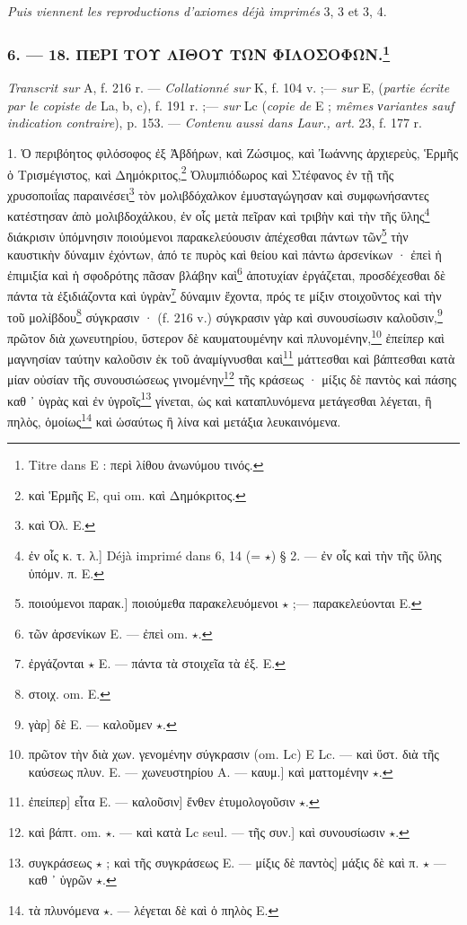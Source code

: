 \documentclass[a4paper, 11pt, oneside, polutonikogreek, french]{article}
\begin{document}
\emph{Puis viennent les reproductions d'axiomes déjà imprimés} 3, 3 et 3, 4.

\bigskip
\centerline{\EightStarTaper}
\centerline{\EightStarTaper\EightStarTaper}
\bigskip

\subsubsection[6. --- 18. ΠΕΡΙ ΤΟΥ ΛΙΘΟΥ ΤΩΝ ΦΙΛΟΣΟΦΩΝ.]{6. --- 18. ΠΕΡΙ ΤΟΥ ΛΙΘΟΥ ΤΩΝ ΦΙΛΟΣΟΦΩΝ.\footnote{Titre dans E : περὶ λίθου ἀνωνύμου τινός.}}

\emph{Transcrit sur} A, f. 216 r. --- \emph{Collationné sur} K, f. 104 v. ;--- \emph{sur} E, (\emph{partie écrite par le copiste de} La, b, c), f. 191 r. ;--- \emph{sur} Lc (\emph{copie de} E ; \emph{mêmes νariantes sauf indication contraire}), p. 153. --- \emph{Contenu aussi dans Laur., art.} 23, f. 177 r.

\bigskip

1. Ὁ περιβόητος φιλόσοφος ἐξ Ἀβδήρων, καὶ Ζώσιμος, καὶ Ἰωάννης ἀρχιερεὺς, Ἑρμῆς ὁ Τρισμέγιστος, καὶ Δημόκριτος,\footnote{καὶ Ἑρμῆς E, qui om. καὶ Δημόκριτος.} Ὀλυμπιόδωρος καὶ Στέφανος ἐν τῇ τῆς χρυσοποιΐας παραινέσει\footnote{καὶ Ὀλ. E.} τὸν μολιβδόχαλκον ἐμυσταγώγησαν καὶ συμφωνήσαντες κατέστησαν ἀπὸ μολιβδοχάλκου, ἐν οἷς μετὰ πεῖραν καὶ τριβὴν καὶ τὴν τῆς ὕλης\footnote{ἐν οἷς κ. τ. λ.] Déjà imprimé dans 6, 14 (= $\star$) § 2. --- ἐν οἷς καὶ τὴν τῆς ὕλης ὑπόμν. π. E.} διάκρισιν ὑπόμνησιν ποιούμενοι παρακελεύουσιν ἀπέχεσθαι πάντων τῶν\footnote{ποιούμενοι παρακ.] ποιούμεθα παρακελευόμενοι $\star$ ;--- παρακελεύονται E.} τὴν καυστικὴν δύναμιν ἐχόντων, ἀπό τε πυρὸς καὶ θείου καὶ πάντω ἀρσενίκων · ἐπεὶ ἡ ἐπιμιξία καὶ ἡ σφοδρότης πᾶσαν βλάβην καὶ\footnote{τῶν ἀρσενίκων E. --- ἐπεὶ om. $\star$.} ἀποτυχίαν ἐργάζεται, προσδέχεσθαι δὲ πάντα τὰ ἐξιδιάζοντα καὶ ὑγρὰν\footnote{ἐργάζονται $\star$ E. --- πάντα τὰ στοιχεῖα τὰ ἐξ. E.} δύναμιν ἔχοντα, πρός τε μίξιν στοιχοῦντος καὶ τὴν τοῦ μολίβδου\footnote{στοιχ. om. E.} σύγκρασιν · (f. 216 v.) σύγκρασιν γὰρ καὶ συνουσίωσιν καλοῦσιν,\footnote{γὰρ] δὲ E. --- καλοῦμεν $\star$.} πρῶτον διὰ χωνευτηρίου, ὕστερον δὲ καυματουμένην καὶ πλυνομένην,\footnote{πρῶτον τὴν διὰ χων. γενομένην σύγκρασιν (om. Lc) E Lc. --- καὶ ὕστ. διὰ τῆς καύσεως πλυν. E. --- χωνευστηρίου A. --- καυμ.] καὶ ματτομένην $\star$.} ἐπείπερ καὶ μαγνησίαν ταύτην καλοῦσιν ἐκ τοῦ ἀναμίγνυσθαι καὶ\footnote{ἐπείπερ] εἶτα E. --- καλοῦσιν] ἔνθεν ἐτυμολογοῦσιν $\star$.} μάττεσθαι καὶ βάπτεσθαι κατὰ μίαν οὐσίαν τῆς συνουσιώσεως γινομένην\footnote{καὶ βάπτ. om. $\star$. --- καὶ κατὰ Lc seul. --- τῆς συν.] καὶ συνουσίωσιν $\star$.} τῆς κράσεως · μίξις δὲ παντὸς καὶ πάσης καθ ᾽ ὑγρὰς καὶ ἐν ὑγροῖς\footnote{συγκράσεως $\star$ ; καὶ τῆς συγκράσεως E. --- μίξις δὲ παντὸς] μάξις δὲ καὶ π. $\star$ --- καθ ᾽ ὑγρῶν $\star$.} γίνεται, ὡς καὶ καταπλυνόμενα μετάγεσθαι λέγεται, ἢ πηλὸς, ὁμοίως\footnote{τὰ πλυνόμενα $\star$. --- λέγεται δὲ καὶ ὁ πηλὸς E.} καὶ ὡσαύτως ἢ λίνα καὶ μετάξια λευκαινόμενα.
\end{document}
